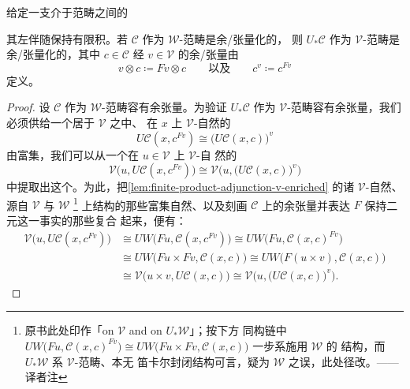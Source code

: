 \begin{proposition}\label{prop:change-of-base-tensored-cotensored}
给定一支介于\trCartesianClosed{}范畴之间的\trAdjunction
\begin{center}
\end{center}
其左伴随保持有限积。若 $\mathcal{C}$ 作为 $\mathcal{W}$-范畴是余/张量化的，
则 $U_{*}\mathcal{C}$ 作为 $\mathcal{V}$-范畴是余/张量化的，其中 $c\in\mathcal{C}$
经 $v\in\mathcal{V}$ 的余/张量由
\[ v\otimes c\coloneqq Fv\otimes c
   \qquad\text{以及}\qquad
   c^{v}\coloneqq c^{Fv} \]
定义。
\end{proposition}

\begin{proof}
设 $\mathcal{C}$ 作为 $\mathcal{W}$-范畴容有余张量。为验证 $U_{*}\mathcal{C}$
作为 $\mathcal{V}$-范畴容有余张量，我们必须供给一个居于 $\mathcal{V}$ 之中、
在 $x$ 上 $\mathcal{V}$-自然的\trIsomorphism
\[ U\mathcal{C}(x,c^{Fv})\cong\bigl(U\mathcal{C}(x,c)\bigr)^{v} \]
由富集\trYonedaLemma，我们可以从一个在 $u\in\mathcal{V}$ 上 $\mathcal{V}$-自
然的\trIsomorphism
\[ \mathcal{V}\bigl(u,U\mathcal{C}(x,c^{Fv})\bigr)
   \cong\mathcal{V}\bigl(u,\bigl(U\mathcal{C}(x,c)\bigr)^{v}\bigr) \]
中提取出这个\trIsomorphism。为此，把\cref{lem:finite-product-adjunction-v-enriched}
的诸 $\mathcal{V}$-自然\trIsomorphism、源自 $\mathcal{V}$ 与 $\mathcal{W}$%
\footnote{原书此处印作「on $\mathcal{V}$ and on $U_{*}\mathcal{W}$」；按下方
同构链中 $UW\bigl(Fu,\mathcal{C}(x,c)^{Fv}\bigr)\cong UW\bigl(Fu\times Fv,\mathcal{C}(x,c)\bigr)$ 一步系施用 $\mathcal{W}$ 的%
\trCartesianClosed{}结构，而 $U_{*}\mathcal{W}$ 系 $\mathcal{V}$-范畴、本无
笛卡尔封闭结构可言，疑为 $\mathcal{W}$ 之误，此处径改。——译者注}
上\trCartesianClosed{}结构的那些富集自然\trIsomorphism、以及刻画 $\mathcal{C}$
上的余张量并表达 $F$ 保持二元\trProduct{}这一事实的那些\trIsomorphism{}复合%
起来，便有：
\begin{align*}
\mathcal{V}\bigl(u,U\mathcal{C}(x,c^{Fv})\bigr)
  &\cong UW\bigl(Fu,\mathcal{C}(x,c^{Fv})\bigr)
   \cong UW\bigl(Fu,\mathcal{C}(x,c)^{Fv}\bigr)\\
  &\cong UW\bigl(Fu\times Fv,\mathcal{C}(x,c)\bigr)
   \cong UW\bigl(F(u\times v),\mathcal{C}(x,c)\bigr)\\
  &\cong\mathcal{V}\bigl(u\times v,U\mathcal{C}(x,c)\bigr)
   \cong\mathcal{V}\bigl(u,\bigl(U\mathcal{C}(x,c)\bigr)^{v}\bigr).
\end{align*}
\end{proof}

